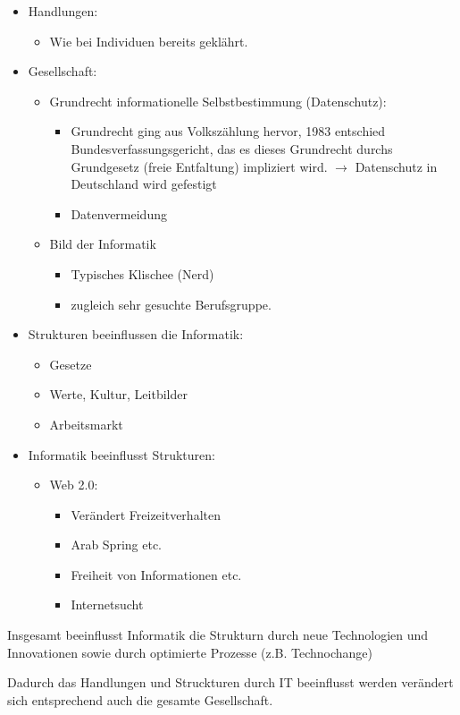 \begin{itemize}
\item Handlungen: 
	\begin{itemize}
		\item Wie bei Individuen bereits geklährt.
	\end{itemize}
\item Gesellschaft:
	\begin{itemize}
		\item Grundrecht informationelle Selbstbestimmung (Datenschutz):
			\begin{itemize}
				\item Grundrecht ging aus Volkszählung hervor, 1983 entschied Bundesverfassungsgericht, das es dieses Grundrecht durchs Grundgesetz (freie Entfaltung) impliziert wird.
				$ \rightarrow $ Datenschutz in Deutschland wird gefestigt 
				\item Datenvermeidung %
			\end{itemize}
		\item Bild der Informatik
			\begin{itemize}
				\item Typisches Klischee (Nerd)
				\item zugleich sehr gesuchte Berufsgruppe.
			\end{itemize}
	\end{itemize}

\item Strukturen beeinflussen die Informatik:
	\begin{itemize}
		\item Gesetze
		\item Werte, Kultur, Leitbilder 
		\item Arbeitsmarkt
	\end{itemize}
\item Informatik beeinflusst Strukturen:
		\begin{itemize}
		\item Web 2.0:
			\begin{itemize}
			\item Verändert Freizeitverhalten
			\item Arab Spring etc.
			\item Freiheit von Informationen etc.
			\item Internetsucht
			\end{itemize}
		\end{itemize}
\end{itemize}

Insgesamt beeinflusst Informatik die Strukturn durch neue Technologien und Innovationen sowie durch optimierte Prozesse (z.B. Technochange)

Dadurch das Handlungen und Struckturen durch IT beeinflusst werden verändert sich entsprechend auch die gesamte Gesellschaft.